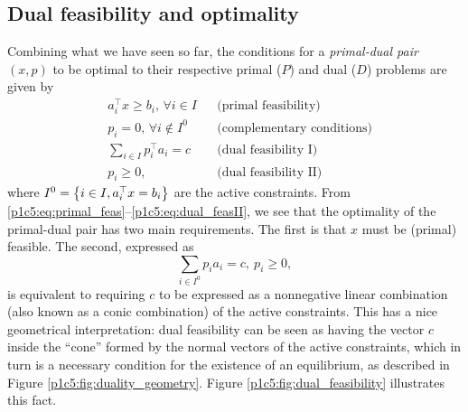 \subsection{Dual feasibility and optimality}

Combining what we have seen so far, the conditions for a \emph{primal-dual pair} $(x,p)$ to be optimal to their respective primal ($P$) and dual ($D$) problems are given by 
%
\begin{align}
	& a_i^\top x \geq b_i, \, \forall i \in I & & \text{(primal feasibility)}\label{p1c5:eq:primal_feas} \\
	& p_i = 0, \, \forall i \notin I^0   & & \text{(complementary conditions)} \label{p1c5:eq:cc}\\
	& \sum_{i \in I} p_i^\top a_i = c & & \text{(dual feasibility I)} \label{p1c5:eq:dual_feasI} \\
	& p_i \geq 0, & & \text{(dual feasibility II)} \label{p1c5:eq:dual_feasII}
\end{align}
%
where $I^0 = \left\{ i \in I, a_i^\top x = b _i \right \}$ are the active constraints. From \eqref{p1c5:eq:primal_feas}--\eqref{p1c5:eq:dual_feasII}, we see that the optimality of the primal-dual pair has two main requirements. The first is that $x$ must be (primal) feasible. The second, expressed as 
%
\begin{equation*}
	\sum_{i \in I^0} p_ia_i = c, \ p_i \geq 0,
\end{equation*}
%
is equivalent to requiring $c$ to be expressed as a nonnegative linear combination (also known as a conic combination) of the active constraints. This has a nice geometrical interpretation: dual feasibility can be seen as having the vector $c$ inside the ``cone'' formed by the normal vectors of the active constraints, which in turn is a necessary condition for the existence of an equilibrium, as described in Figure \ref{p1c5:fig:duality_geometry}. Figure \ref{p1c5:fig:dual_feasibility} illustrates this fact.

